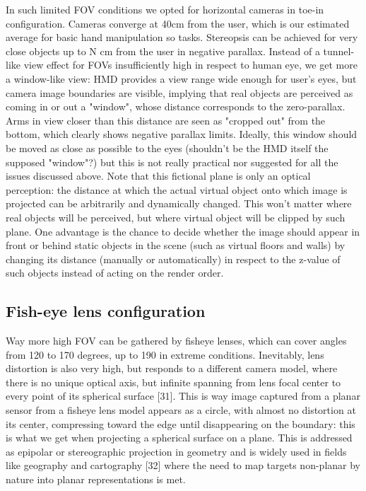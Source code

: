 In such limited FOV conditions we opted for horizontal cameras in toe-in configuration. Cameras converge at 40cm from the user, which is our estimated average for basic hand manipulation so tasks. Stereopsis can be achieved for very close objects up to N cm from the user in negative parallax. Instead of a tunnel-like view effect for FOVs insufficiently high in respect to human eye, we get more a window-like view: HMD provides a view range wide enough for user's eyes, but camera image boundaries are visible, implying that real objects are perceived as coming in or out a "window", whose distance corresponds to the zero-parallax. Arms in view closer than this distance are seen as "cropped out" from the bottom, which clearly shows negative parallax limits. Ideally, this window should be moved as close as possible to the eyes (shouldn't be the HMD itself the supposed "window"?) but this is not really practical nor suggested for all the issues discussed above. Note that this fictional plane is only an optical perception: the distance at which the actual virtual object onto which image is projected can be arbitrarily and dynamically changed. This won't matter where real objects will be perceived, but where virtual object will be clipped by such plane. One advantage is the chance to decide whether the image should appear in front or behind static objects in the scene (such as virtual floors and walls) by changing its distance (manually or automatically) in respect to the z-value of such objects instead of acting on the render order.

\subsection{Fish-eye lens configuration}
Way more high FOV can be gathered by fisheye lenses, which can cover angles from 120 to 170 degrees, up to 190 in extreme conditions. Inevitably, lens distortion is also very high, but responds to a different camera model, where there is no unique optical axis, but infinite spanning from lens focal center to every point of its spherical surface [31]. This is way image captured from a planar sensor from a fisheye lens model appears as a circle, with almost no distortion at its center, compressing toward the edge until disappearing on the boundary: this is what we get when projecting a spherical surface on a plane. This is addressed as epipolar or stereographic projection in geometry and is widely used in fields like geography and cartography [32] where the need to map targets non-planar by nature into planar representations is met.

